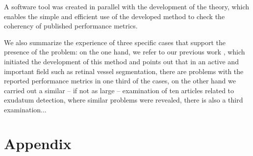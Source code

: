 \documentclass[5p, final]{elsarticle}
\begin{document}
A software tool was created in parallel with the development of the theory, which enables the simple and efficient use of the developed method to check the coherency of published performance metrics.

We also summarize the experience of three specific cases that support the presence of the problem: on the one hand, we refer to our previous work \cite{vessel}, which initiated the development of this method and points out that in an active and important field such as retinal vessel segmentation, there are problems with the reported performance metrics in one third of the cases, on the other hand we carried out a similar -- if not as large -- examination of ten articles related to exudatum detection, where similar problems were revealed, there is also a third examination... 

\section{Appendix}





% 



\end{document}
